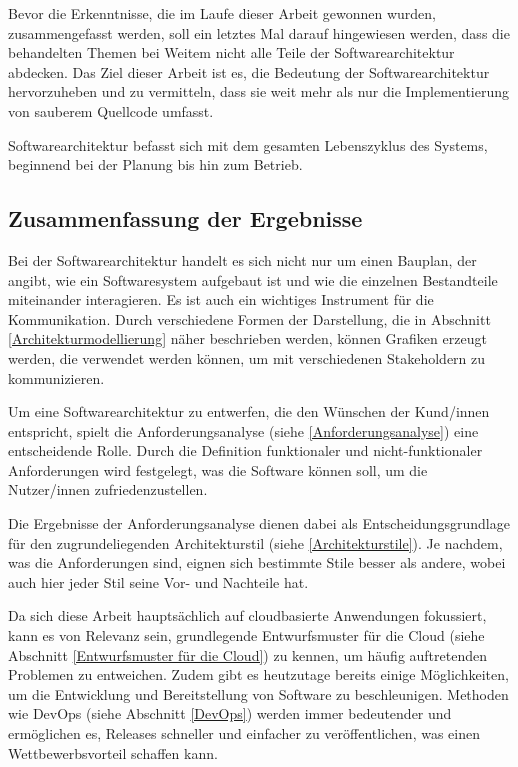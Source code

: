 
Bevor die Erkenntnisse, die im Laufe dieser Arbeit gewonnen wurden, zusammengefasst werden, soll ein letztes Mal darauf hingewiesen werden, dass die behandelten Themen bei Weitem nicht alle Teile der Softwarearchitektur abdecken.
Das Ziel dieser Arbeit ist es, die Bedeutung der Softwarearchitektur hervorzuheben und zu vermitteln, dass sie weit mehr als nur die Implementierung von sauberem Quellcode umfasst.

Softwarearchitektur befasst sich mit dem gesamten Lebenszyklus des Systems, beginnend bei der Planung bis hin zum Betrieb.


    
    \subsection{Zusammenfassung der Ergebnisse}
    
    Bei der Softwarearchitektur handelt es sich nicht nur um einen Bauplan, der angibt, wie ein Softwaresystem aufgebaut ist und wie die einzelnen Bestandteile miteinander interagieren. Es ist auch ein wichtiges Instrument für die Kommunikation. Durch verschiedene Formen der Darstellung, die in Abschnitt \ref{Architekturmodellierung} näher beschrieben werden, können Grafiken erzeugt werden, die verwendet werden können, um mit verschiedenen Stakeholdern zu kommunizieren. 

    Um eine Softwarearchitektur zu entwerfen, die den Wünschen der Kund/innen entspricht, spielt die Anforderungsanalyse (siehe \ref{Anforderungsanalyse}) eine entscheidende Rolle. Durch die Definition funktionaler und nicht-funktionaler Anforderungen wird festgelegt, was die Software können soll, um die Nutzer/innen zufriedenzustellen.  

    Die Ergebnisse der Anforderungsanalyse dienen dabei als Entscheidungsgrundlage für den zugrundeliegenden Architekturstil (siehe \ref{Architekturstile}). Je nachdem, was die Anforderungen sind, eignen sich bestimmte Stile besser als andere, wobei auch hier jeder Stil seine Vor- und Nachteile hat.

    Da sich diese Arbeit hauptsächlich auf cloudbasierte Anwendungen fokussiert, kann es von Relevanz sein, grundlegende Entwurfsmuster für die Cloud (siehe Abschnitt \ref{Entwurfsmuster für die Cloud}) zu kennen, um häufig auftretenden Problemen zu entweichen. Zudem gibt es heutzutage bereits einige Möglichkeiten, um die Entwicklung und Bereitstellung von Software zu beschleunigen. Methoden wie DevOps (siehe Abschnitt \ref{DevOps}) werden immer bedeutender und ermöglichen es, Releases schneller und einfacher zu veröffentlichen, was einen Wettbewerbsvorteil schaffen kann.

